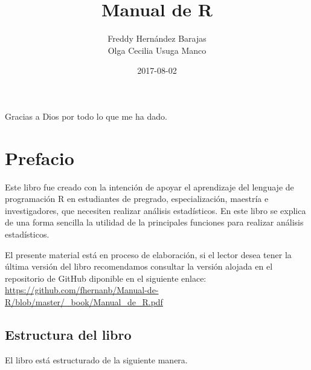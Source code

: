 \documentclass[10pt,]{krantz}
\title{Manual de R}
\author{Freddy Hernández Barajas\\
Olga Cecilia Usuga Manco}
\date{2017-08-02}
\let\proglang=\textsf
\begin{document}
\maketitle


\thispagestyle{empty}

\begin{center}

Gracias a Dios por todo lo que me ha dado.

\end{center}

\setlength{\abovedisplayskip}{-5pt}
\setlength{\abovedisplayshortskip}{-5pt}

{
\hypersetup{linkcolor=black}
\setcounter{tocdepth}{2}
\tableofcontents
}
\listoftables
\listoffigures
\chapter*{Prefacio}\label{prefacio}


Este libro fue creado con la intención de apoyar el aprendizaje del
lenguaje de programación \proglang{R} en estudiantes de pregrado,
especialización, maestría e investigadores, que necesiten realizar
análisis estadísticos. En este libro se explica de una forma sencilla la
utilidad de la principales funciones para realizar análisis
estadísticos.

El presente material está en proceso de elaboración, si el lector desea
tener la última versión del libro recomendamos consultar la versión
alojada en el repositorio de GitHub diponible en el siguiente enlace:
\url{https://github.com/fhernanb/Manual-de-R/blob/master/_book/Manual_de_R.pdf}

\section*{Estructura del libro}\label{estructura-del-libro}


El libro está estructurado de la siguiente manera.
\end{document}
